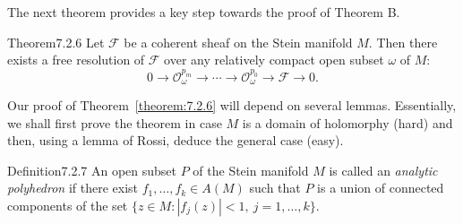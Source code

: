 The next theorem provides a key step towards the proof of Theorem B.
\begin{originaltheorem}{Theorem}{7.2.6}
Let $\mathcal{F}$ be a coherent sheaf on the Stein manifold $M$. Then there exists a free resolution of $\mathcal{F}$ over any relatively compact open subset $\omega$ of $M$:
\[
0\to\mathcal{O}_\omega^{p_m}\to\cdots\to\mathcal{O}_\omega^{p_0}\to\mathcal{F}\to0.
\]
\end{originaltheorem}
Our proof of Theorem~\ref{theorem:7.2.6} will depend on several lemmas. Essentially, we shall first prove the theorem in case $M$ is a domain of holomorphy (hard) and then, using a lemma of Rossi, deduce the general case (easy).
\begin{originaltheorem}{Definition}{7.2.7}
An open subset $P$ of the Stein manifold $M$ is called an \emph{analytic polyhedron} if there exist $f_1,\ldots,f_k\in A(M)$ such that $P$ is a union of connected components of the set $\{z\in M:|f_j(z)|<1,\ j=1,\ldots,k\}$.
\end{originaltheorem}
